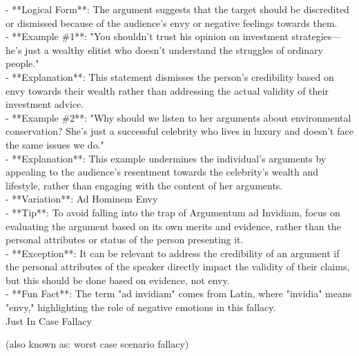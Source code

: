 \documentclass[a4paper,12pt,single,pdftex]{scrbook}
\begin{document}
    
      - **Logical Form**: The argument suggests that the target should be discredited or dismissed because of the audience's envy or negative feelings towards them.
    \\

    
      - **Example \#1**: "You shouldn't trust his opinion on investment strategies—he's just a wealthy elitist who doesn’t understand the struggles of ordinary people."
    \\

    
      - **Explanation**: This statement dismisses the person's credibility based on envy towards their wealth rather than addressing the actual validity of their investment advice.
    \\

    
      - **Example \#2**: "Why should we listen to her arguments about environmental conservation? She's just a successful celebrity who lives in luxury and doesn't face the same issues we do."
    \\

    
      - **Explanation**: This example undermines the individual's arguments by appealing to the audience's resentment towards the celebrity’s wealth and lifestyle, rather than engaging with the content of her arguments.
    \\

    
      - **Variation**: Ad Hominem Envy
    \\

    
      - **Tip**: To avoid falling into the trap of Argumentum ad Invidiam, focus on evaluating the argument based on its own merits and evidence, rather than the personal attributes or status of the person presenting it.
    \\

    
      - **Exception**: It can be relevant to address the credibility of an argument if the personal attributes of the speaker directly impact the validity of their claims, but this should be done based on evidence, not envy.
    \\

    
      - **Fun Fact**: The term "ad invidiam" comes from Latin, where "invidia" means "envy," highlighting the role of negative emotions in this fallacy.
    \\

  

Just In Case Fallacy
    
      (also known as: worst case scenario fallacy)
    \\
\end{document}
